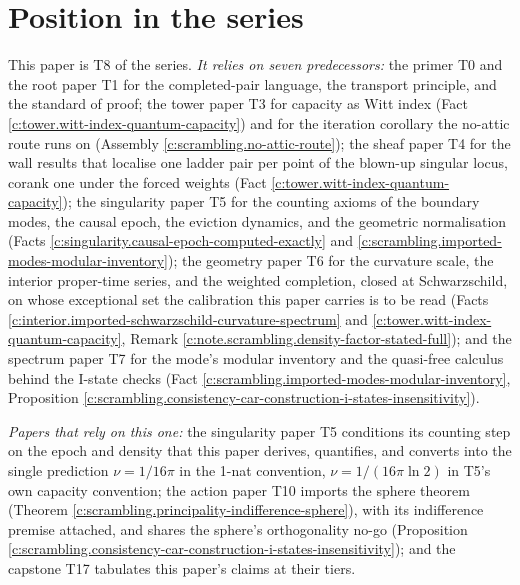 \documentclass[11pt]{article}
\theoremstyle{definition}
\theoremstyle{plain}
\begin{document}
\section{Position in the series}

\label{c:note.scrambling.setting-position-series}
This paper is T8 of the series. \emph{It relies on seven predecessors:} the primer T0 \cite{ButlerT0} and the root paper T1 \cite{ButlerT1} for the completed-pair language, the transport principle, and the standard of proof; the tower paper T3 \cite{ButlerT3} for capacity as Witt index (Fact \ref{c:tower.witt-index-quantum-capacity}) and for the iteration corollary the no-attic route runs on (Assembly \ref{c:scrambling.no-attic-route}); the sheaf paper T4 \cite{ButlerT4} for the wall results that localise one ladder pair per point of the blown-up singular locus, corank one under the forced weights (Fact \ref{c:tower.witt-index-quantum-capacity}); the singularity paper T5 \cite{ButlerT5} for the counting axioms of the boundary modes, the causal epoch, the eviction dynamics, and the geometric normalisation (Facts \ref{c:singularity.causal-epoch-computed-exactly} and \ref{c:scrambling.imported-modes-modular-inventory}); the geometry paper T6 \cite{ButlerT6} for the curvature scale, the interior proper-time series, and the weighted completion, closed at Schwarzschild, on whose exceptional set the calibration this paper carries is to be read (Facts \ref{c:interior.imported-schwarzschild-curvature-spectrum} and \ref{c:tower.witt-index-quantum-capacity}, Remark \ref{c:note.scrambling.density-factor-stated-full}); and the spectrum paper T7 \cite{ButlerT7} for the mode's modular inventory and the quasi-free calculus behind the I-state checks (Fact \ref{c:scrambling.imported-modes-modular-inventory}, Proposition \ref{c:scrambling.consistency-car-construction-i-states-insensitivity}).

\emph{Papers that rely on this one:} the singularity paper T5 \cite{ButlerT5} conditions its counting step on the epoch and density that this paper derives, quantifies, and converts into the single prediction $\nu = 1/16\pi$ in the 1-nat convention, $\nu = 1/(16\pi\ln 2)$ in T5's own capacity convention; the action paper T10 \cite{ButlerT10} imports the sphere theorem (Theorem \ref{c:scrambling.principality-indifference-sphere}), with its indifference premise attached, and shares the sphere's orthogonality no-go (Proposition \ref{c:scrambling.consistency-car-construction-i-states-insensitivity}); and the capstone T17 \cite{ButlerT17} tabulates this paper's claims at their tiers.
\end{document}
